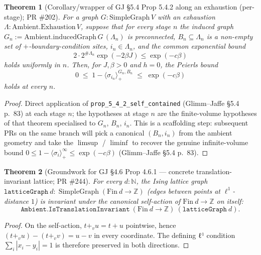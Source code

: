 \documentclass[a4paper,11pt]{article}
\newtheorem{theorem}{Theorem}
\begin{document}
\begin{theorem}[Corollary/wrapper of GJ \S 5.4 Prop 5.4.2 along an
exhaustion (per-stage); PR \#202]
For a graph $G : \mathrm{SimpleGraph}\, V$ with an exhaustion
$\Lambda : \mathrm{Ambient.Exhaustion}\, V$, suppose that for every
stage $n$ the induced graph $G_n := \mathrm{Ambient.inducedGraph}\,G\,(\Lambda_n)$
is preconnected, $B_n \subseteq \Lambda_n$ is a non-empty set of
$+$-boundary-condition sites,
$i_n \in \Lambda_n$, and the common exponential bound
\[
  2 \cdot 2^{\#\Lambda_n} \exp(-2\beta J) \le \exp(-c\beta)
\]
holds uniformly in $n$. Then, for $J, \beta > 0$ and $h = 0$, the
Peierls bound
\[
  0 \;\le\; 1 - \langle \sigma_{i_n} \rangle_{+}^{G_n, B_n}
  \;\le\; \exp(-c\beta)
\]
holds at every $n$.
\end{theorem}

\begin{proof}
Direct application of \texttt{prop\_5\_4\_2\_self\_contained}
(Glimm--Jaffe \cite{glimm-jaffe} \S 5.4 p.~83) at each stage $n$;
the hypotheses at stage $n$ are the finite-volume hypotheses of
that theorem specialised to $G_n$, $B_n$, $i_n$. This is a
scaffolding step: subsequent PRs on the same branch will pick a
canonical $(B_n, i_n)$ from the ambient geometry and take the
$\limsup$ / $\liminf$ to recover the genuine infinite-volume
bound $0 \le 1 - \langle\sigma_i\rangle_+^\infty \le \exp(-c\beta)$
(Glimm--Jaffe \cite{glimm-jaffe} \S 5.4 p.~83).
\end{proof}

\begin{theorem}[Groundwork for GJ \S 4.6 Prop 4.6.1 — concrete
translation-invariant lattice; PR \#244]
For every $d : \mathbb{N}$, the Ising lattice graph
$\texttt{latticeGraph}\ d : \operatorname{SimpleGraph}(\mathrm{Fin}\ d \to \mathbb{Z})$
(edges between points at $\ell^1$-distance $1$) is invariant under
the canonical self-action of $\mathrm{Fin}\ d \to \mathbb{Z}$ on
itself:
\[
  \texttt{Ambient.IsTranslationInvariant}\ (\mathrm{Fin}\ d \to \mathbb{Z})\ (\texttt{latticeGraph}\ d).
\]
\end{theorem}
\begin{proof}
On the self-action, $t +_v u = t + u$ pointwise, hence
$(t +_v u) - (t +_v v) = u - v$ in every coordinate. The defining
ℓ¹ condition $\sum_i |x_i - y_i| = 1$ is therefore preserved in
both directions.
\end{proof}
\end{document}
